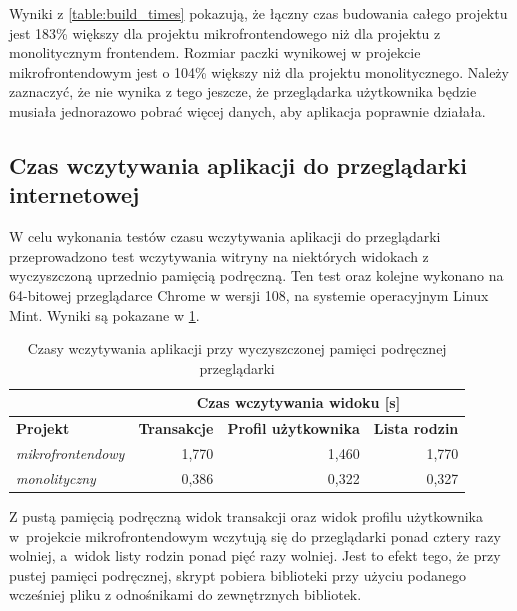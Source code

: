 \documentclass{SGGW-thesis}
\begin{document}
    Wyniki z \cref{table:build_times} pokazują, że łączny czas budowania całego projektu jest 183\% większy dla projektu mikrofrontendowego niż dla projektu z monolitycznym frontendem. Rozmiar paczki wynikowej w projekcie mikrofrontendowym jest o 104\% większy niż dla projektu monolitycznego. Należy zaznaczyć, że nie wynika z tego jeszcze, że przeglądarka użytkownika będzie musiała jednorazowo pobrać więcej danych, aby aplikacja poprawnie działała.

    \subsection{Czas wczytywania aplikacji do przeglądarki internetowej}
    W celu wykonania testów czasu wczytywania aplikacji do przeglądarki przeprowadzono test wczytywania witryny na niektórych widokach z wyczyszczoną uprzednio pamięcią podręczną. Ten test oraz kolejne wykonano na 64-bitowej przeglądarce Chrome w wersji 108, na systemie operacyjnym Linux Mint. Wyniki są pokazane w \cref{table:runtimes_without_cache}.

    \begin{table}[h]
      \centering
      \caption{Czasy wczytywania aplikacji przy wyczyszczonej pamięci podręcznej przeglądarki}
      \begin{tabular}{l|rrr|}
      \cline{2-4}
       & \multicolumn{3}{c|}{\textbf{Czas wczytywania widoku {[}s{]}}} \\ \hline
      \multicolumn{1}{|l|}{\textbf{Projekt}} & \multicolumn{1}{l|}{\textbf{Transakcje}} & \multicolumn{1}{l|}{\textbf{Profil użytkownika}} & \multicolumn{1}{l|}{\textbf{Lista rodzin}} \\ \hline
      \multicolumn{1}{|l|}{\textit{mikrofrontendowy}} & \multicolumn{1}{r|}{1,770} & \multicolumn{1}{r|}{1,460} & 1,770 \\ \hline
      \multicolumn{1}{|l|}{\textit{monolityczny}} & \multicolumn{1}{r|}{0,386} & \multicolumn{1}{r|}{0,322} & 0,327 \\ \hline
      \end{tabular}
      \label{table:runtimes_without_cache}
    \end{table}

    Z pustą pamięcią podręczną widok transakcji oraz widok profilu użytkownika w~projekcie mikrofrontendowym wczytują się do przeglądarki ponad cztery razy wolniej, a~widok listy rodzin ponad pięć razy wolniej. Jest to efekt tego, że przy pustej pamięci podręcznej, skrypt pobiera biblioteki przy użyciu podanego wcześniej pliku z odnośnikami do zewnętrznych bibliotek.
\end{document}

